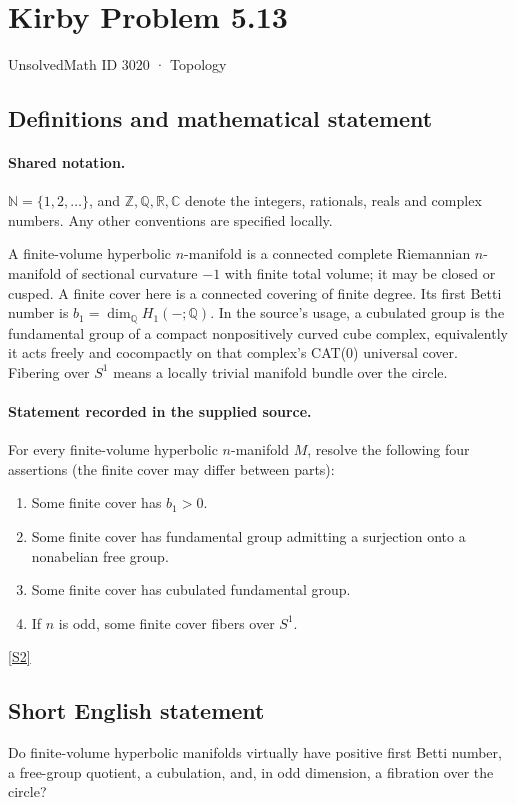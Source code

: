 \documentclass[11pt]{article}
\newcommand{\sref}[2]{\hyperlink{source:#1:#2}{[S#2]}}
\begin{document}
\setcounter{section}{3019}
\section{Kirby Problem 5.13}\label{3020}
{\small\sffamily UnsolvedMath ID 3020 · Topology}
\subsection{Definitions and mathematical statement}

\paragraph{Shared notation.}$\mathbb N=\{1,2,\ldots\}$, and $\mathbb Z,\mathbb Q,\mathbb R,\mathbb C$ denote the integers, rationals, reals and complex numbers. Any other conventions are specified locally.


A finite-volume hyperbolic $n$-manifold is a connected complete Riemannian $n$-manifold of sectional curvature $-1$ with finite total volume; it may be closed or cusped. A finite cover here is a connected covering of finite degree. Its first Betti number is $b_1=\dim_{\mathbb Q}H_1(-;\mathbb Q)$. In the source's usage, a cubulated group is the fundamental group of a compact nonpositively curved cube complex, equivalently it acts freely and cocompactly on that complex's CAT(0) universal cover. Fibering over $S^1$ means a locally trivial manifold bundle over the circle.
\paragraph{Statement recorded in the supplied source.}
For every finite-volume hyperbolic $n$-manifold $M$, resolve the following four assertions (the finite cover may differ between parts):
\begin{enumerate}
\item[(a)] Some finite cover has $b_1>0$.
\item[(b)] Some finite cover has fundamental group admitting a surjection onto a nonabelian free group.
\item[(c)] Some finite cover has cubulated fundamental group.
\item[(d)] If $n$ is odd, some finite cover fibers over $S^1$.
\end{enumerate} \sref{3020}{2}
\subsection{Short English statement}
Do finite-volume hyperbolic manifolds virtually have positive first Betti number, a free-group quotient, a cubulation, and, in odd dimension, a fibration over the circle?
\end{document}
